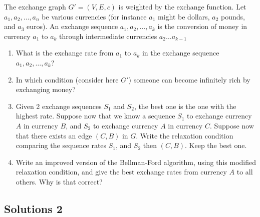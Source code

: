 \documentclass{article}
\begin{document}
The exchange graph $G' = (V,E, c)$ is weighted by the exchange function. Let $a_1, a_2, \ldots, a_n$ be various currencies (for instance $a_1$ might be dollars, $a_2$ pounds, and $a_3$ euros). An exchange sequence $a_1, a_2, \ldots, a_k$ is the conversion of money in currency $a_1$ to $a_k$ through intermediate currencies $a_2 \ldots a_{k-1}$
\begin{enumerate}
	\item What is the exchange rate from $a_1$ to $a_k$ in the exchange sequence $a_1, a_2, \ldots, a_k$?
	\item In which condition (consider here $G'$) someone can become infinitely rich by exchanging money?
	\item Given 2 exchange sequences $S_1$ and $S_2$, the best one is the one with the highest rate. Suppose now that we know a sequence $S_1$ to exchange currency $A$ in currency $B$, and $S_2$ to exchange currency $A$ in currency $C$. Suppose now that there exists an edge $(C,B)$ in $G$. Write the relaxation condition comparing the sequence rates $S_1$, and $S_2$ then $(C,B)$. Keep the best one.
	\item Write an improved version of the Bellman-Ford algorithm, using this modified relaxation condition, and give the best exchange rates from currency $A$ to all others. Why is that correct?
\end{enumerate}

\subsection*{Solutions 2}
\end{document}
